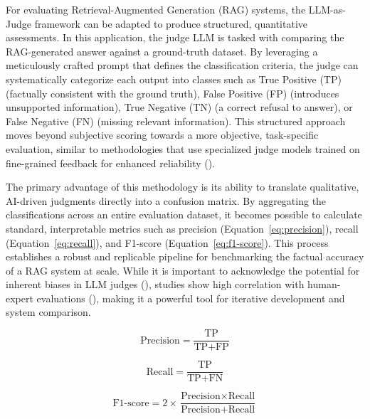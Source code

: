             For evaluating Retrieval-Augmented Generation (RAG) systems, the LLM-as-Judge framework can be adapted to produce structured, quantitative assessments. In this application, the judge LLM is tasked with comparing the RAG-generated answer against a ground-truth dataset. By leveraging a meticulously crafted prompt that defines the classification criteria, the judge can systematically categorize each output into classes such as True Positive (TP) (factually consistent with the ground truth), False Positive (FP) (introduces unsupported information), True Negative (TN) (a correct refusal to answer), or False Negative (FN) (missing relevant information). This structured approach moves beyond subjective scoring towards a more objective, task-specific evaluation, similar to methodologies that use specialized judge models trained on fine-grained feedback for enhanced reliability (\cite{Kim2024}).

            The primary advantage of this methodology is its ability to translate qualitative, AI-driven judgments directly into a confusion matrix. By aggregating the classifications across an entire evaluation dataset, it becomes possible to calculate standard, interpretable metrics such as precision (Equation~\ref{eq:precision}), recall (Equation~\ref{eq:recall}), and F1-score (Equation~\ref{eq:f1-score}). This process establishes a robust and replicable pipeline for benchmarking the factual accuracy of a RAG system at scale. While it is important to acknowledge the potential for inherent biases in LLM judges (\cite{Gu2025}), studies show high correlation with human-expert evaluations (\cite{li2024llmsasjudgescomprehensivesurveyllmbased}), making it a powerful tool for iterative development and system comparison.

            \begin{equation}
                \text{Precision} = \frac{\text{TP}}{\text{TP} + \text{FP}}
                \label{eq:precision}
            \end{equation}

            \begin{equation}
                \text{Recall} = \frac{\text{TP}}{\text{TP} + \text{FN}}
                \label{eq:recall}
            \end{equation}

            \begin{equation}
                \text{F1-score} = 2 \times \frac{\text{Precision} \times \text{Recall}}{\text{Precision} + \text{Recall}}
                \label{eq:f1-score}
            \end{equation}
